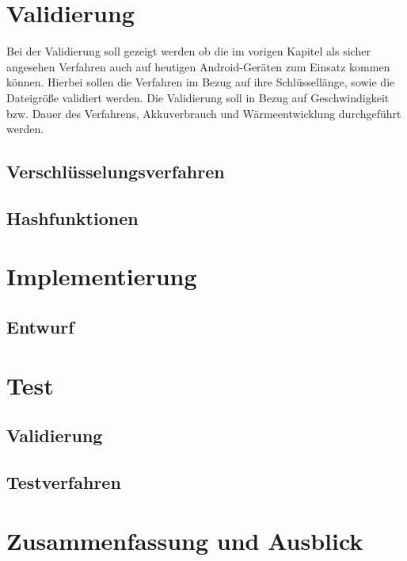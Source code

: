\documentclass[10pt, a4paper]{scrreprt}
\begin{document}
\chapter{Validierung}
Bei der Validierung soll gezeigt werden ob die im vorigen Kapitel als sicher angesehen Verfahren auch auf heutigen Android-Geräten zum Einsatz kommen können. Hierbei sollen die Verfahren im Bezug auf ihre Schlüssellänge, sowie die Dateigröße validiert werden. Die Validierung soll in Bezug auf Geschwindigkeit bzw. Dauer des Verfahrens, Akkuverbrauch und Wärmeentwicklung durchgeführt werden. 


\section{Verschlüsselungsverfahren}
\section{Hashfunktionen}

\chapter{Implementierung}
\section{Entwurf}

\chapter{Test}
\section{Validierung}
\section{Testverfahren}

\chapter{Zusammenfassung und Ausblick}
\end{document}
